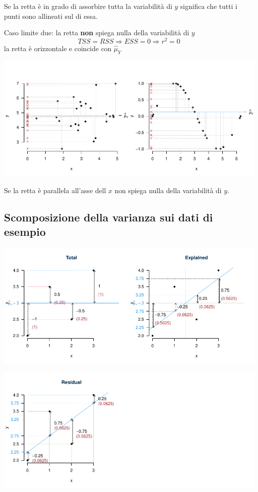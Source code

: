 \documentclass[
  11pt,
]{book}
\theoremstyle{mytheoremstyle}
\theoremstyle{mydefstyle}
\begin{document}
Se la retta è in grado di assorbire tutta la variabilità di \(y\) significa che tutti
i punti sono allineati sul di essa.

Caso limite due: la retta \textbf{non} spiega nulla della variabilità di \(y\)
\[TSS = RSS\Rightarrow ESS=0\Rightarrow r^2=0\]
la retta è orizzontale e coincide con \(\hat\mu_Y\)

\begin{center}\includegraphics{Appunti_di_Statistica_2025_files/figure-latex/17-regressione-I-57-1} \end{center}

Se la retta è parallela all'asse dell \(x\) non spiega nulla della variabilità di \(y\).

\subsection{Scomposizione della varianza sui dati di esempio}\label{scomposizione-della-varianza-sui-dati-di-esempio}

\begin{center}\includegraphics{Appunti_di_Statistica_2025_files/figure-latex/17-regressione-I-58-1} \end{center}

\begin{center}\includegraphics{Appunti_di_Statistica_2025_files/figure-latex/17-regressione-I-59-1} \end{center}
\end{document}
